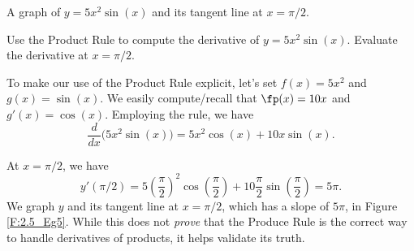 \begin{marginfigure}
\caption{A graph of $y = 5x^2\sin(x)$ and its tangent line at $x=\pi/2$.}
\label{F:2.5_Eg5}
\end{marginfigure}

\begin{example} \label{Ex:2.5.Eg2}
Use the Product Rule to compute the derivative of $y=5x^2\sin(x)$. Evaluate the derivative at $x=\pi/2$.

\solution To make our use of the Product Rule explicit, let's set $f(x) = 5x^2$ and $g(x) = \sin(x)$. We easily compute/recall that $\fp(x) = 10x$ and $g'(x) = \cos(x)$. Employing the rule, we have $$\frac{d}{dx}\Big(5x^2\sin(x)\Big) = 5x^2\cos(x) + 10x\sin(x).$$

At $x=\pi/2$, we have 
\[ y'(\pi/2) = 5\left(\frac{\pi}{2}\right)^2\cos \left(\frac{\pi}2\right) + 10\frac{\pi}2 \sin\left(\frac{\pi}{2}\right) = 5\pi.\] 
We graph $y$ and its tangent line at $x=\pi/2$, which has a slope of $5\pi$, in Figure \ref{F:2.5_Eg5}. While this does not \textit{prove} that the Produce Rule is the correct way to handle derivatives of products, it helps validate its truth.
\end{example}